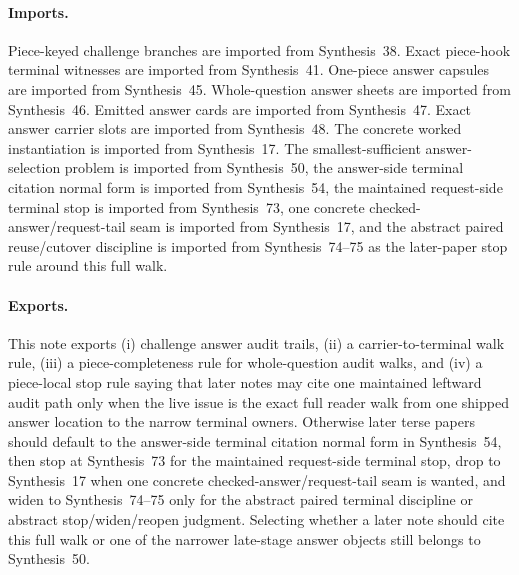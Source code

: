 \documentclass[11pt]{article}
\begin{document}
\paragraph{Imports.}
Piece-keyed challenge branches are imported from Synthesis~38.\cite{series:challengebranches}
Exact piece-hook terminal witnesses are imported from Synthesis~41.\cite{series:challengeterminalwitnesses}
One-piece answer capsules are imported from Synthesis~45.\cite{series:challengeanswercapsules}
Whole-question answer sheets are imported from Synthesis~46.\cite{series:challengeanswersheets}
Emitted answer cards are imported from Synthesis~47.\cite{series:challengeanswercards}
Exact answer carrier slots are imported from Synthesis~48.\cite{series:challengeanswercarrierslots}
The concrete worked instantiation is imported from Synthesis~17.\cite{series:workedexample}
The smallest-sufficient answer-selection problem is imported from Synthesis~50, the answer-side terminal citation normal form is imported from Synthesis~54, the maintained request-side terminal stop is imported from Synthesis~73, one concrete checked-answer/request-tail seam is imported from Synthesis~17, and the abstract paired reuse/cutover discipline is imported from Synthesis~74--75 as the later-paper stop rule around this full walk.\cite{series:challengeanswercitationdockets,series:challengeanswerreviewmenus,series:workedexample,series:pairedterminalcitationdiscipline,series:pairedterminalcutoverrules}

\paragraph{Exports.}
This note exports (i) challenge answer audit trails, (ii) a carrier-to-terminal walk rule, (iii) a piece-completeness rule for whole-question audit walks, and (iv) a piece-local stop rule saying that later notes may cite one maintained leftward audit path only when the live issue is the exact full reader walk from one shipped answer location to the narrow terminal owners.
Otherwise later terse papers should default to the answer-side terminal citation normal form in Synthesis~54, then stop at Synthesis~73 for the maintained request-side terminal stop, drop to Synthesis~17 when one concrete checked-answer/request-tail seam is wanted, and widen to Synthesis~74--75 only for the abstract paired terminal discipline or abstract stop/widen/reopen judgment. Selecting whether a later note should cite this full walk or one of the narrower late-stage answer objects still belongs to Synthesis~50.\cite{series:challengeanswercitationdockets,series:challengeanswerreviewmenus,series:workedexample,series:pairedterminalcitationdiscipline,series:pairedterminalcutoverrules}
\end{document}
